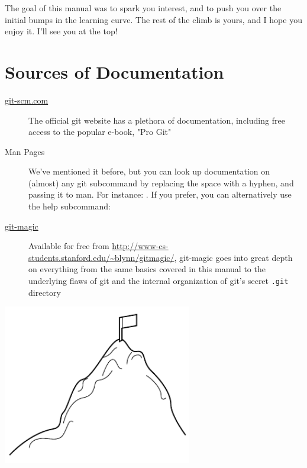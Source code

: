 \documentclass[11pt,letterpaper,twoside]{report}
\begin{document}
The goal of this manual was to spark you interest, and to push you over the
initial bumps in the learning curve. The rest of the climb is yours, and I hope
you enjoy it. I'll see you at the top!

\section{Sources of Documentation}

\begin{description}
\item[\href{http://git-scm.com/documentation}{git-scm.com}]
    The official git website has a plethora of documentation, including free
    access to the popular e-book, "Pro Git"
\item[Man Pages]
    We've mentioned it before, but you can look up documentation on (almost) any
    git subcommand by replacing the space with a hyphen, and passing it to man.
    For instance: . If you prefer, you can alternatively use
    the help subcommand: 
\item[\href{http://www-cs-students.stanford.edu/~blynn/gitmagic/}{git-magic}]
    Available for free from
    \url{http://www-cs-students.stanford.edu/~blynn/gitmagic/}, git-magic goes
    into great depth on everything from the same basics covered in this manual
    to the underlying flaws of git and the internal organization of git's secret
    \texttt{.git} directory
\end{description}

\vspace{\fill}
\begin{flushright}
\includegraphics[height=7cm]{resources/learning_curve_abstract.pdf}
\end{flushright}
\vspace*{\fill}
\end{document}
